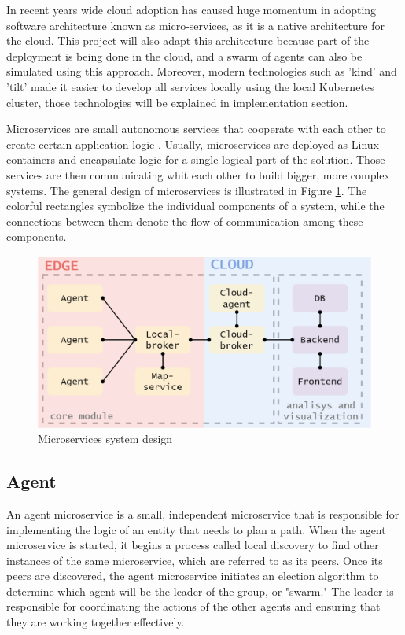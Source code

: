 In recent years wide cloud adoption has caused huge momentum in adopting software architecture known as micro-services, as it is a native architecture for the cloud. This project will also adapt this architecture because part of the deployment is being done in the cloud, and a swarm of agents can also be simulated using this approach. Moreover, modern technologies such as 'kind' and 'tilt' made it easier to develop all services locally using the local Kubernetes cluster, those technologies will be explained in implementation section.

Microservices are small autonomous services that cooperate with each other to create certain application logic \cite{building_microservices}. Usually, microservices are deployed as Linux containers and encapsulate logic for a single logical part of the solution. Those services are then communicating whit each other to build bigger, more complex systems. The general design of microservices is illustrated in Figure \ref{fig:micro_services}. The colorful rectangles symbolize the individual components of a system, while the connections between them denote the flow of communication among these components.

\begin{figure}[H]
    \centering
    \includegraphics[width=\textwidth]{pictures/services.png}
    \caption{Microservices system design}
    \label{fig:micro_services}
\end{figure}

\subsection{Agent}
An agent microservice is a small, independent microservice that is responsible for implementing the logic of an entity that needs to plan a path. When the agent microservice is started, it begins a process called local discovery to find other instances of the same microservice, which are referred to as its peers. Once its peers are discovered, the agent microservice initiates an election algorithm to determine which agent will be the leader of the group, or "swarm." The leader is responsible for coordinating the actions of the other agents and ensuring that they are working together effectively.

